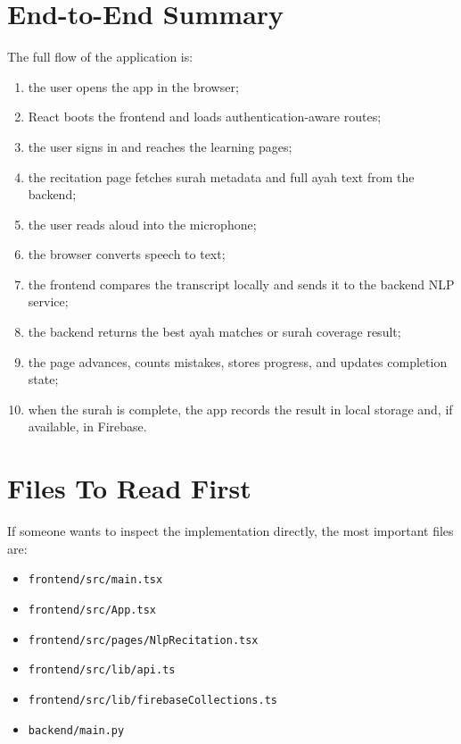 \documentclass[11pt,a4paper]{article}
\begin{document}
\section{End-to-End Summary}
The full flow of the application is:
\begin{enumerate}
  \item the user opens the app in the browser;
  \item React boots the frontend and loads authentication-aware routes;
  \item the user signs in and reaches the learning pages;
  \item the recitation page fetches surah metadata and full ayah text from the backend;
  \item the user reads aloud into the microphone;
  \item the browser converts speech to text;
  \item the frontend compares the transcript locally and sends it to the backend NLP service;
  \item the backend returns the best ayah matches or surah coverage result;
  \item the page advances, counts mistakes, stores progress, and updates completion state;
  \item when the surah is complete, the app records the result in local storage and, if available, in Firebase.
\end{enumerate}

\section{Files To Read First}
If someone wants to inspect the implementation directly, the most important files are:
\begin{itemize}
  \item \texttt{frontend/src/main.tsx}
  \item \texttt{frontend/src/App.tsx}
  \item \texttt{frontend/src/pages/NlpRecitation.tsx}
  \item \texttt{frontend/src/lib/api.ts}
  \item \texttt{frontend/src/lib/firebaseCollections.ts}
  \item \texttt{backend/main.py}
\end{itemize}
\end{document}
